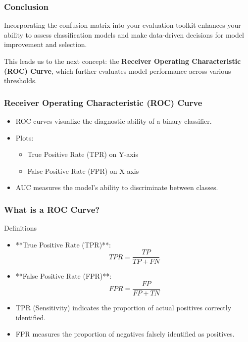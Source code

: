 \documentclass[aspectratio=169]{beamer}
\begin{document}
\begin{frame}[fragile]
  \frametitle{Conclusion}
  Incorporating the confusion matrix into your evaluation toolkit enhances your ability to assess classification models and make data-driven decisions for model improvement and selection.
  
  This leads us to the next concept: the \textbf{Receiver Operating Characteristic (ROC) Curve}, which further evaluates model performance across various thresholds.
\end{frame}

\begin{frame}[fragile]
    \frametitle{Receiver Operating Characteristic (ROC) Curve}
    \begin{itemize}
        \item ROC curves visualize the diagnostic ability of a binary classifier.
        \item Plots:
        \begin{itemize}
            \item True Positive Rate (TPR) on Y-axis
            \item False Positive Rate (FPR) on X-axis
        \end{itemize}
        \item AUC measures the model's ability to discriminate between classes.
    \end{itemize}
\end{frame}

\begin{frame}[fragile]
    \frametitle{What is a ROC Curve?}
    \begin{block}{Definitions}
        \begin{itemize}
            \item **True Positive Rate (TPR)**: 
            \begin{equation}
            TPR = \frac{TP}{TP + FN}
            \end{equation}
            \item **False Positive Rate (FPR)**:
            \begin{equation}
            FPR = \frac{FP}{FP + TN}
            \end{equation}
        \end{itemize}
    \end{block}
    \begin{itemize}
        \item TPR (Sensitivity) indicates the proportion of actual positives correctly identified.
        \item FPR measures the proportion of negatives falsely identified as positives.
    \end{itemize}
\end{frame}
\end{document}
